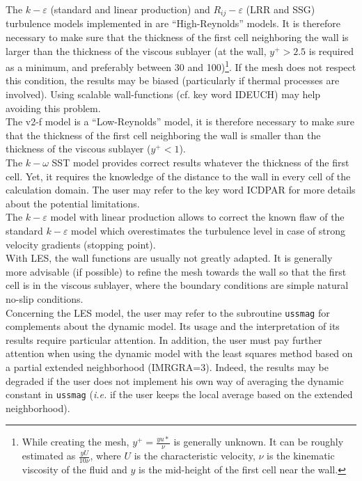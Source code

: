 The $k-\varepsilon$ (standard and linear production) and $R_{ij}-\varepsilon$
(LRR and SSG) turbulence
models implemented in \CS are ``High-Reynolds'' models. It is therefore
necessary to make sure that the thickness of the first cell neighboring
the wall is larger than the thickness of the viscous sublayer (at the
wall, $y^+>2.5$ is required as a minimum, and preferably between 30 and
100)\footnote{While creating the mesh, $y^+=\frac{yu*}{\nu}$ is
generally unknown. It can be roughly estimated as $\frac{yU}{10\nu}$, where
$U$ is the characteristic velocity, $\nu$ is the kinematic viscosity of the fluid
 and $y$ is the mid-height of the first cell near the wall.}. If the mesh does
 not respect this condition, the results may be biased
(particularly if thermal processes are involved). Using scalable wall-functions
(cf. key word IDEUCH) may help avoiding this problem.\\
The v2-f model is a ``Low-Reynolds'' model, it is therefore necessary to
make sure that the thickness of the first cell neighboring the wall is
smaller than the thickness of the viscous sublayer ($y^+<1$).\\
The $k-\omega$ SST model provides correct results whatever the thickness of the first cell.
Yet, it requires the knowledge of the distance to the wall in every
cell of the calculation domain. The user may refer to the key word
ICDPAR for more details about the potential limitations.\\
The $k-\varepsilon$ model with linear production allows to correct the
known flaw of the standard $k-\varepsilon$ model which overestimates the
turbulence level in case of strong velocity gradients (stopping point).\\
With LES, the wall functions are usually not greatly adapted. It is generally more advisable
(if possible) to refine the mesh towards the wall so that the first cell is in the
viscous sublayer, where the boundary conditions are simple natural no-slip conditions.\\
Concerning the LES model, the user may refer to the subroutine
\texttt{ussmag} for complements about the dynamic model. Its usage
and the interpretation of its results require particular attention.
In addition, the user must pay further attention when using the dynamic
model with the least squares method based on a partial extended
neighborhood (IMRGRA=3). Indeed, the results may be degraded if the user
does not implement his own way of averaging the dynamic constant in
\texttt{ussmag} (\textit{i.e.} if the user keeps the local average based
on the extended neighborhood).\\

